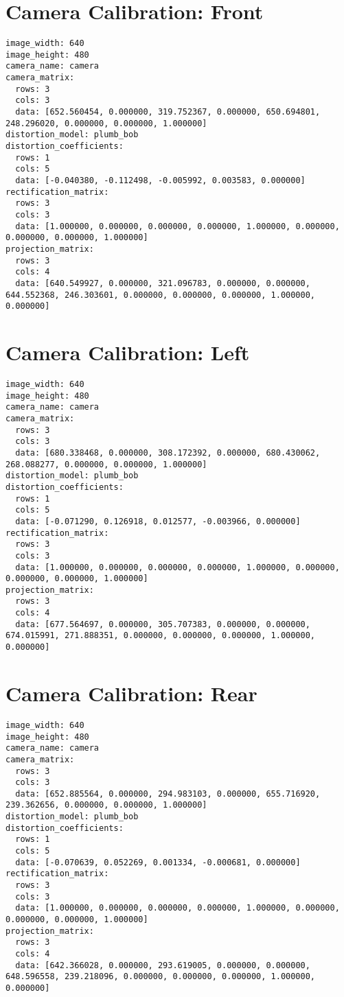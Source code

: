 \section{Camera Calibration: Front}
\begin{verbatim}
image_width: 640
image_height: 480
camera_name: camera
camera_matrix:
  rows: 3
  cols: 3
  data: [652.560454, 0.000000, 319.752367, 0.000000, 650.694801, 248.296020, 0.000000, 0.000000, 1.000000]
distortion_model: plumb_bob
distortion_coefficients:
  rows: 1
  cols: 5
  data: [-0.040380, -0.112498, -0.005992, 0.003583, 0.000000]
rectification_matrix:
  rows: 3
  cols: 3
  data: [1.000000, 0.000000, 0.000000, 0.000000, 1.000000, 0.000000, 0.000000, 0.000000, 1.000000]
projection_matrix:
  rows: 3
  cols: 4
  data: [640.549927, 0.000000, 321.096783, 0.000000, 0.000000, 644.552368, 246.303601, 0.000000, 0.000000, 0.000000, 1.000000, 0.000000]
\end{verbatim}


\section{Camera Calibration: Left}
\begin{verbatim}
image_width: 640
image_height: 480
camera_name: camera
camera_matrix:
  rows: 3
  cols: 3
  data: [680.338468, 0.000000, 308.172392, 0.000000, 680.430062, 268.088277, 0.000000, 0.000000, 1.000000]
distortion_model: plumb_bob
distortion_coefficients:
  rows: 1
  cols: 5
  data: [-0.071290, 0.126918, 0.012577, -0.003966, 0.000000]
rectification_matrix:
  rows: 3
  cols: 3
  data: [1.000000, 0.000000, 0.000000, 0.000000, 1.000000, 0.000000, 0.000000, 0.000000, 1.000000]
projection_matrix:
  rows: 3
  cols: 4
  data: [677.564697, 0.000000, 305.707383, 0.000000, 0.000000, 674.015991, 271.888351, 0.000000, 0.000000, 0.000000, 1.000000, 0.000000]
\end{verbatim}


\section{Camera Calibration: Rear}
\begin{verbatim}
image_width: 640
image_height: 480
camera_name: camera
camera_matrix:
  rows: 3
  cols: 3
  data: [652.885564, 0.000000, 294.983103, 0.000000, 655.716920, 239.362656, 0.000000, 0.000000, 1.000000]
distortion_model: plumb_bob
distortion_coefficients:
  rows: 1
  cols: 5
  data: [-0.070639, 0.052269, 0.001334, -0.000681, 0.000000]
rectification_matrix:
  rows: 3
  cols: 3
  data: [1.000000, 0.000000, 0.000000, 0.000000, 1.000000, 0.000000, 0.000000, 0.000000, 1.000000]
projection_matrix:
  rows: 3
  cols: 4
  data: [642.366028, 0.000000, 293.619005, 0.000000, 0.000000, 648.596558, 239.218096, 0.000000, 0.000000, 0.000000, 1.000000, 0.000000]
\end{verbatim}


